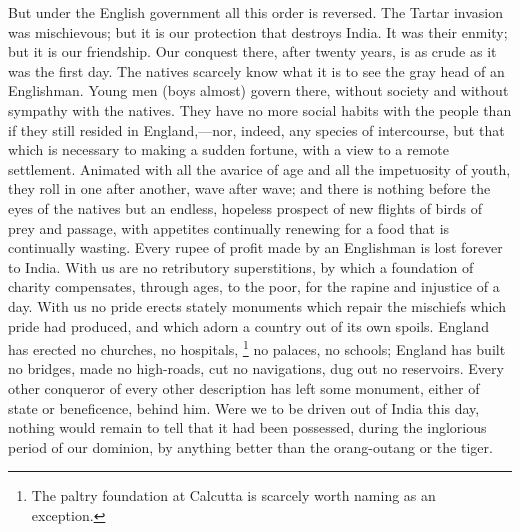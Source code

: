 But under the English government all this order is reversed. The Tartar invasion was mischievous; but it is our protection that destroys India. It was their enmity; but it is our friendship. Our conquest there, after twenty years, is as crude as it was the first day. The natives scarcely know what it is to see the gray head of an Englishman. Young men (boys almost) govern there, without society and without sympathy with the natives. They have no more social habits with the people than if they still resided in England,—nor, indeed, any species of intercourse, but that which is necessary to making a sudden fortune, with a view to a remote settlement. Animated with all the avarice of age and all the impetuosity of youth, they roll in one after another, wave after wave; and there is nothing before the eyes of the natives but an endless, hopeless prospect of new flights of birds of prey and passage, with appetites continually renewing for a food that is continually wasting. Every rupee of profit made by an Englishman is lost forever to India. With us are no retributory superstitions, by which a foundation of charity compensates, through ages, to the poor, for the rapine and injustice of a day. With us no pride erects stately monuments which repair the mischiefs which pride had produced, and which adorn a country out of its own spoils. England has erected no churches, no hospitals,
\footnote{ The paltry foundation at Calcutta is scarcely worth naming as an exception.}
 no palaces, no schools; England has built no bridges, made no high-roads, cut no navigations, dug out no reservoirs. Every other conqueror of every other description has left some monument, either of state or beneficence, behind him. Were we to be driven out of India this day, nothing would remain to tell that it had been possessed, during the inglorious period of our dominion, by anything better than the orang-outang or the tiger.

